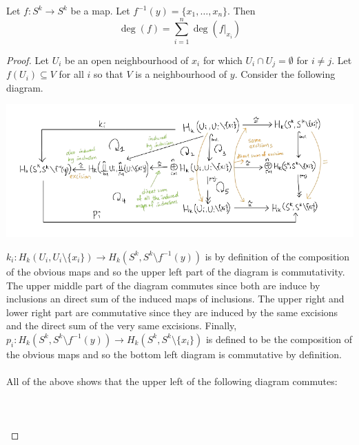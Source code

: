 \documentclass[a4paper]{article}
\begin{document}
\begin{prp}{}{} Let $f:S^k\to S^k$ be a map. Let $f^{-1}(y)=\{x_1,\dots,x_n\}$. Then $$\deg(f)=\sum_{i=1}^n\deg(f|_{x_i})$$ \tcbline
\begin{proof}
Let $U_i$ be an open neighbourhood of $x_i$ for which $U_i\cap U_j=\emptyset$ for $i\neq j$. Let $f(U_i)\subseteq V$ for all $i$ so that $V$ is a neighbourhood of $y$. Consider the following diagram. 

\begin{center}
\includegraphics[scale = 0.5]{Image 3}
\end{center}

$k_i:H_k(U_i,U_i\setminus\{x_i\})\to H_k(S^k,S^k\setminus f^{-1}(y))$ is by definition of the composition of the obvious maps and so the upper left part of the diagram is commutativity. The upper middle part of the diagram commutes since both are induce by inclusions an direct sum of the induced maps of inclusions. The upper right and lower right part are commutative since they are induced by the same excisions and the direct sum of the very same excisions. Finally, $p_i:H_k(S^k,S^k\setminus f^{-1}(y))\to H_k(S^k,S^k\setminus\{x_i\})$ is defined to be the composition of the obvious maps and so the bottom left diagram is commutative by definition. \\~\\

All of the above shows that the upper left of the following diagram commutes: \\~\\
\\~\\


\end{proof}
\end{prp}
\end{document}
